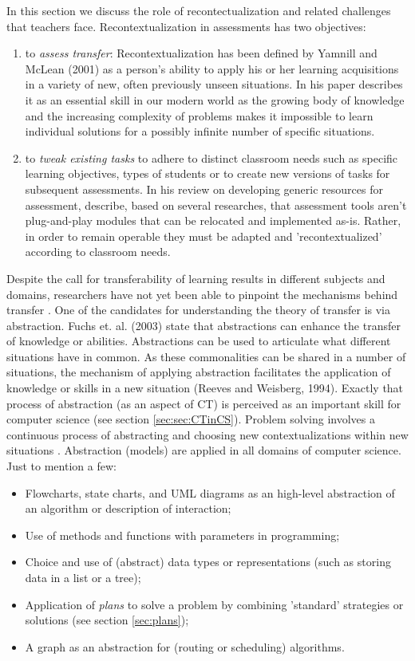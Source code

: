 In this section we discuss the role of recontectualization and related challenges that teachers face. Recontextualization in assessments has two objectives:
\begin{enumerate}
\item to \emph{assess transfer}: Recontextualization has been defined by Yamnill and McLean (2001) as a person's ability to apply his or her learning acquisitions in a variety of new, often previously unseen situations. In his paper  describes it as an essential skill in our modern world as the growing body of knowledge and the increasing complexity of problems makes it impossible to learn individual solutions for a possibly infinite number of specific situations.
\item to \emph{tweak existing tasks} to adhere to distinct classroom needs such as specific learning objectives, types of students or to create new versions of tasks for subsequent assessments. In his review on developing generic resources for assessment, \citeauthor{hermansen2014reworking} describe, based on several researches, that assessment tools aren't plug-and-play modules that can be relocated and implemented as-is. Rather, in order to remain operable they must be adapted and 'recontextualized' according to classroom needs.
\end{enumerate}



Despite the call for transferability of learning results in different subjects and domains, researchers have not yet been able to pinpoint the mechanisms behind transfer \cite{oers2004recontextualization}. One of the candidates for understanding the theory of transfer is via abstraction. Fuchs et. al. (2003) state that abstractions can enhance the transfer of knowledge or abilities. Abstractions can be used to articulate what different situations have in common. As these commonalities can be shared in a number of situations, the mechanism of applying abstraction facilitates the application of knowledge or skills in a new situation (Reeves and Weisberg, 1994). Exactly that process of abstraction (as an aspect of CT) is perceived as an important skill for computer science (see section \ref{sec:sec:CTinCS}). Problem solving involves a continuous process of abstracting and choosing new contextualizations within new situations \cite{oers2004recontextualization}. Abstraction (models) are applied in all domains of computer science. Just to mention a few:
\begin{itemize}
\item Flowcharts, state charts, and UML diagrams as an high-level abstraction of an algorithm or description of interaction;
\item Use of methods and functions with parameters in programming;
\item Choice and use of (abstract) data types or representations (such as storing data in a list or a tree);
\item Application of \textit{plans} to solve a problem by combining 'standard' strategies or solutions (see section \ref{sec:plans});
\item A graph as an abstraction for (routing or scheduling) algorithms.
\end{itemize}


